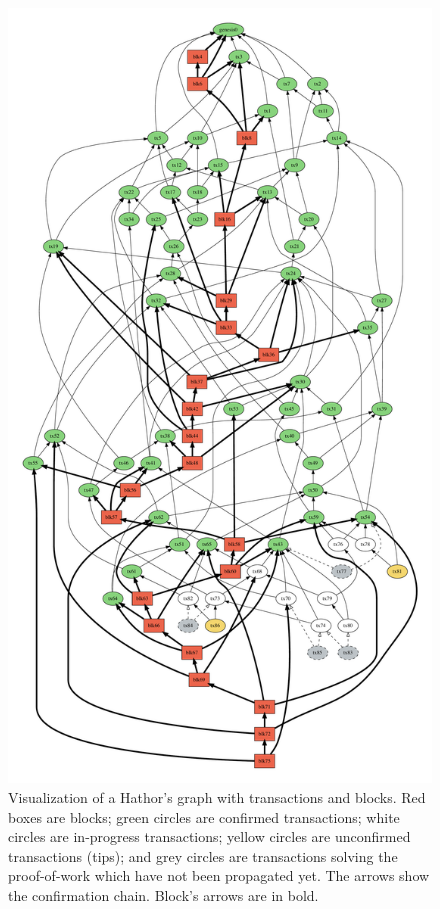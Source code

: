 \begin{figure}[!htb]
\centering\includegraphics[height=0.88\textheight]{./images01/sim/hathor-2.pdf}
\caption{Visualization of a Hathor's graph with transactions and blocks. Red boxes are blocks; green circles are confirmed transactions; white circles are in-progress transactions; yellow circles are unconfirmed transactions (tips); and grey circles are transactions solving the proof-of-work which have not been propagated yet. The arrows show the confirmation chain. Block's arrows are in bold. \label{fig:hathor-dag-big}}
\end{figure}

